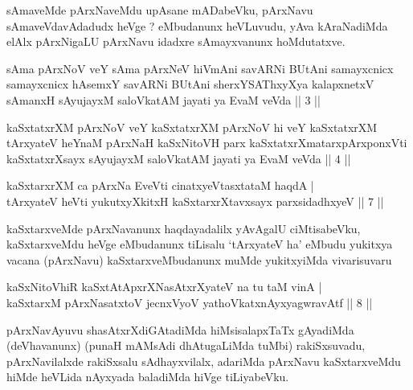 \begin{artha}
sAmaveMde pArxNaveMdu upAsane mADabeVku, pArxNavu sAmaveVdavAdadudx heVge ? eMbudanunx heVLuvudu, yAva kAraNadiMda elAlx pArxNigaLU pArxNavu idadxre sAmayxvanunx hoMdutatxve.
\end{artha}

\begin{shl}
sAma pArxNoV veY sAma pArxNeV hiVmAni savARNi BUtAni samayxcnicx samayxcnicx hAsemxY savARNi BUtAni sherxYSAThxyXya kalapxnetxV sAmanxH sAyujayxM saloVkatAM jayati ya EvaM veVda || 3 ||
\end{shl}

\begin{shl}
kaSxtatxrXM pArxNoV veY kaSxtatxrXM pArxNoV hi veY kaSxtatxrXM tArxyateV heYnaM pArxNaH kaSxNitoVH parx kaSxtatxrXmatarxpArxponxVti kaSxtatxrXsayx sAyujayxM saloVkatAM jayati ya EvaM veVda || 4 ||
\end{shl}


\begin{shl}
kaSxtarxrXM ca pArxNa EveVti cinatxyeVtasxtataM haqdA | \\
tArxyateV heVti yukutxyXkitxH kaSxtarxrXtavxsayx parxsidadhxyeV \hfill ||  7 || 
\end{shl}

\begin{artha}
kaSxtarxveMde pArxNavanunx haqdayadalilx yAvAgalU ciMtisabeVku, kaSxtarxveMdu heVge eMbudanunx tiLisalu `tArxyateV ha' eMbudu yukitxya vacana (pArxNavu) kaSxtarxveMbudanunx muMde yukitxyiMda vivarisuvaru \mdash 
\end{artha}

\begin{shl}
kaSxNitoVhiR kaSxtAtApxrXNasAtxrXyateV na tu taM vinA | \\
kaSxtarxM pArxNasatxtoV jecnxVyoV yathoVkatxnAyxyagwravAtf \hfill ||  8 || 
\end{shl}

\begin{artha}
pArxNavAyuvu shasAtxrXdiGAtadiMda hiMsisalapxTaTx gAyadiMda (deVhavanunx) (punaH mAMsAdi dhAtugaLiMda tuMbi) rakiSxsuvadu, pArxNavilalxde rakiSxsalu sAdhayxvilalx, adariMda pArxNavu kaSxtarxveMdu hiMde heVLida nAyxyada baladiMda hiVge tiLiyabeVku.
\end{artha}

